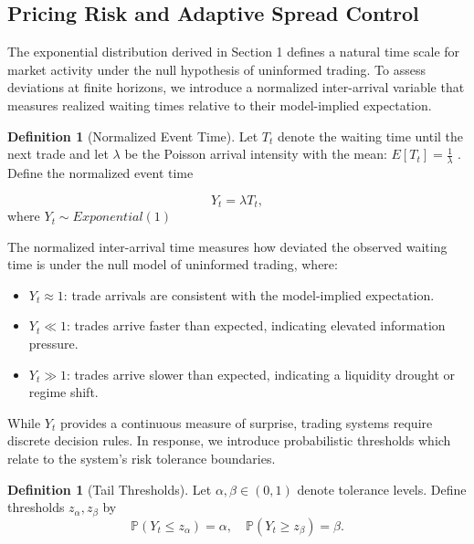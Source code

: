 \documentclass[12pt]{article}
\theoremstyle{plain}
\theoremstyle{definition}
\newtheorem{definition}[theorem]{Definition} %
\numberwithin{equation}{section}
\begin{document}
\subsection{Pricing Risk and Adaptive Spread Control}

The exponential distribution derived in Section 1 defines a natural time scale for market activity under the null hypothesis of uninformed trading. To assess deviations at finite horizons, we introduce a normalized inter-arrival variable that measures realized waiting times relative to their model-implied expectation.
\begin{definition}[Normalized Event Time]
Let $T_t$ denote the waiting time until the next trade and let $\lambda$ be the Poisson arrival intensity with the mean: $E[T_t] = \frac{1}{\lambda}$ . Define the normalized event time 

\begin{equation}
Y_t =  \lambda T_t, 
\end{equation}
where  $Y_t \sim  Exponential(1)$
\end{definition}

The normalized inter-arrival time measures how deviated the observed waiting time is under the null model of uninformed trading, where:

\begin{itemize}
    \item $Y_t \approx 1$: trade arrivals are consistent with the model-implied expectation.
    \item $Y_t \ll 1$: trades arrive faster than expected, indicating elevated information pressure.
    \item $Y_t \gg 1$: trades arrive slower than expected, indicating a liquidity drought or regime shift.
\end{itemize}

While $Y_t$ provides a continuous measure of surprise, trading systems require discrete decision rules. In response, we introduce probabilistic thresholds which relate to the system's risk tolerance boundaries.

\begin{definition}[Tail Thresholds]
Let $\alpha, \beta \in (0,1)$ denote tolerance levels.
Define thresholds $z_\alpha, z_\beta$ by
\begin{equation}
\mathbb{P}(Y_t \le z_\alpha) = \alpha, \quad
\mathbb{P}(Y_t \ge z_\beta) = \beta.
\end{equation}
\end{definition}
\end{document}
